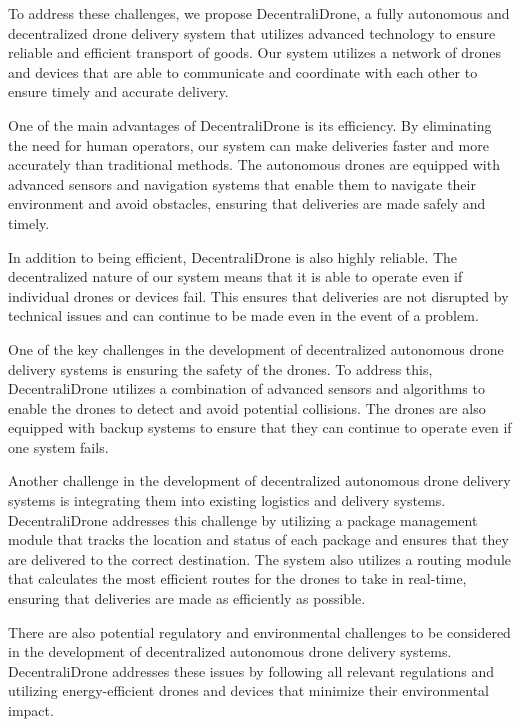 \documentclass[conference]{IEEEtran}
\begin{document}
To address these challenges, we propose DecentraliDrone, a fully autonomous and decentralized drone delivery system that utilizes advanced technology to ensure reliable and efficient transport of goods. Our system utilizes a network of drones and devices that are able to communicate and coordinate with each other to ensure timely and accurate delivery.

One of the main advantages of DecentraliDrone is its efficiency. By eliminating the need for human operators, our system can make deliveries faster and more accurately than traditional methods. The autonomous drones are equipped with advanced sensors and navigation systems that enable them to navigate their environment and avoid obstacles, ensuring that deliveries are made safely and timely.

In addition to being efficient, DecentraliDrone is also highly reliable. The decentralized nature of our system means that it is able to operate even if individual drones or devices fail. This ensures that deliveries are not disrupted by technical issues and can continue to be made even in the event of a problem.

One of the key challenges in the development of decentralized autonomous drone delivery systems is ensuring the safety of the drones. To address this, DecentraliDrone utilizes a combination of advanced sensors and algorithms to enable the drones to detect and avoid potential collisions. The drones are also equipped with backup systems to ensure that they can continue to operate even if one system fails.

Another challenge in the development of decentralized autonomous drone delivery systems is integrating them into existing logistics and delivery systems. DecentraliDrone addresses this challenge by utilizing a package management module that tracks the location and status of each package and ensures that they are delivered to the correct destination. The system also utilizes a routing module that calculates the most efficient routes for the drones to take in real-time, ensuring that deliveries are made as efficiently as possible.

There are also potential regulatory and environmental challenges to be considered in the development of decentralized autonomous drone delivery systems. DecentraliDrone addresses these issues by following all relevant regulations and utilizing energy-efficient drones and devices that minimize their environmental impact.
\end{document}

